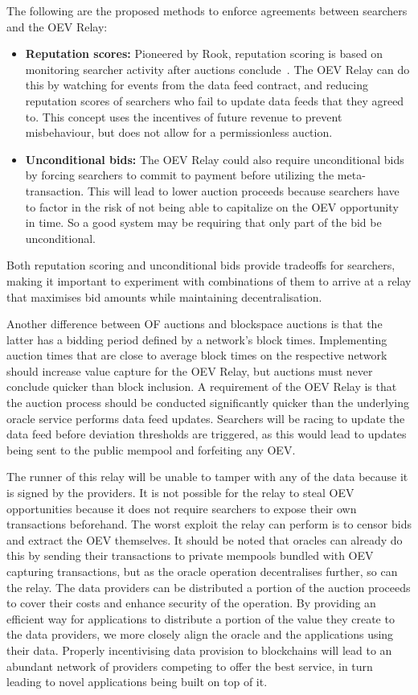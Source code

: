 \documentclass[11pt]{article}
\begin{document}
The following are the proposed methods to enforce agreements between searchers and the OEV Relay:
\begin{itemize}
	\item \textbf{Reputation scores:} Pioneered by Rook, reputation scoring is based on monitoring searcher activity after auctions conclude~\cite{rook-reputation}.
	The OEV Relay can do this by watching for events from the data feed contract, and reducing reputation scores of searchers who fail to update data feeds that they agreed to.
	This concept uses the incentives of future revenue to prevent misbehaviour, but does not allow for a permissionless auction.
	\item \textbf{Unconditional bids:} The OEV Relay could also require unconditional bids by forcing searchers to commit to payment before utilizing the meta-transaction.
	This will lead to lower auction proceeds because searchers have to factor in the risk of not being able to capitalize on the OEV opportunity in time.
	So a good system may be requiring that only part of the bid be unconditional.
\end{itemize}

Both reputation scoring and unconditional bids provide tradeoffs for searchers, making it important to experiment with combinations of them to arrive at a relay that maximises bid amounts while maintaining decentralisation.

Another difference between OF auctions and blockspace auctions is that the latter has a bidding period defined by a network's block times.
Implementing auction times that are close to average block times on the respective network should increase value capture for the OEV Relay, but auctions must never conclude quicker than block inclusion.
A requirement of the OEV Relay is that the auction process should be conducted significantly quicker than the underlying oracle service performs data feed updates.
Searchers will be racing to update the data feed before deviation thresholds are triggered, as this would lead to updates being sent to the public mempool and forfeiting any OEV.

The runner of this relay will be unable to tamper with any of the data because it is signed by the providers.
It is not possible for the relay to steal OEV opportunities because it does not require searchers to expose their own transactions beforehand.
The worst exploit the relay can perform is to censor bids and extract the OEV themselves.
It should be noted that oracles can already do this by sending their transactions to private mempools bundled with OEV capturing transactions, but as the oracle operation decentralises further, so can the relay.
The data providers can be distributed a portion of the auction proceeds to cover their costs and enhance security of the operation.
By providing an efficient way for applications to distribute a portion of the value they create to the data providers, we more closely align the oracle and the applications using their data.
Properly incentivising data provision to blockchains will lead to an abundant network of providers competing to offer the best service, in turn leading to novel applications being built on top of it.
\end{document}
